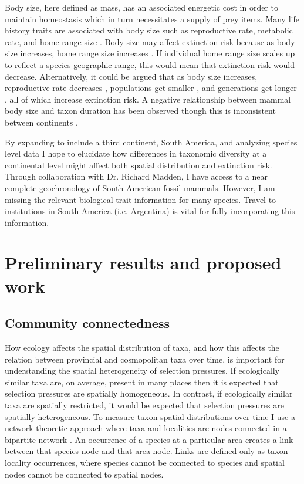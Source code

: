 \documentclass[11pt,letterpaper]{article}
\begin{document}
Body size, here defined as mass, has an associated energetic cost in order to maintain homeostasis which in turn necessitates a supply of prey items. Many life history traits are associated with body size such as reproductive rate, metabolic rate, and home range size \cite{Peters1983a,Damuth1979,Brown1987,Smith2004}. Body size may affect extinction risk because as body size increases, home range size increases \citep{Damuth1979}. If individual home range size scales up to reflect a species geographic range, this would mean that extinction risk would decrease. Alternatively, it could be argued that as body size increases, reproductive rate decreases \citep{Johnson2002b}, populations get smaller \citep{White2007}, and generations get longer \citep{Martin1993a}, all of which increase extinction risk. A negative relationship between mammal body size and taxon duration has been observed \citep{Liow2008,Davidson2012} though this is inconsistent between continents \citep{Tomiya2013,Liow2008}. 

By expanding to include a third continent, South America, and analyzing species level data I hope to elucidate how differences in taxonomic diversity at a continental level might affect both spatial distribution and extinction risk. Through collaboration with Dr. Richard Madden, I have access to a near complete geochronology of South American fossil mammals. However, I am missing the relevant biological trait information for many species. Travel to institutions in South America (i.e. Argentina) is vital for fully incorporating this information.

\section{Preliminary results and proposed work}
\subsection{Community connectedness}
How ecology affects the spatial distribution of taxa, and how this affects the relation between provincial and cosmopolitan taxa over time, is important for understanding the spatial heterogeneity of selection pressures. If ecologically similar taxa are, on average, present in many places then it is expected that selection pressures are spatially homogeneous. In contrast, if ecologically similar taxa are spatially restricted, it would be expected that selection pressures are spatially heterogeneous. To measure taxon spatial distributions over time I use a network theoretic approach where taxa and localities are nodes connected in a bipartite network \citep{Sidor2013,Vilhena2013,Vilhena2013b}. An occurrence of a species at a particular area creates a link between that species node and that area node. Links are defined only as taxon-locality occurrences, where species cannot be connected to species and spatial nodes cannot be connected to spatial nodes. %
\end{document}
